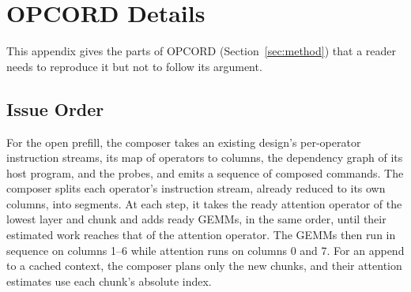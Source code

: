 \section{OPCORD Details}
\label{app:opcord}

This appendix gives the parts of OPCORD (Section~\ref{sec:method}) that a reader needs to reproduce it but not to follow its argument.

\subsection{Issue Order}
\label{app:issue}

For the open prefill, the composer takes an existing design's per-operator instruction streams, its map of operators to columns, the dependency graph of its host program, and the probes, and emits a sequence of composed commands.
The composer splits each operator's instruction stream, already reduced to its own columns, into segments.
At each step, it takes the ready attention operator of the lowest layer and chunk and adds ready GEMMs, in the same order, until their estimated work reaches that of the attention operator.
The GEMMs then run in sequence on columns 1--6 while attention runs on columns 0 and 7.
For an append to a cached context, the composer plans only the new chunks, and their attention estimates use each chunk's absolute index.


